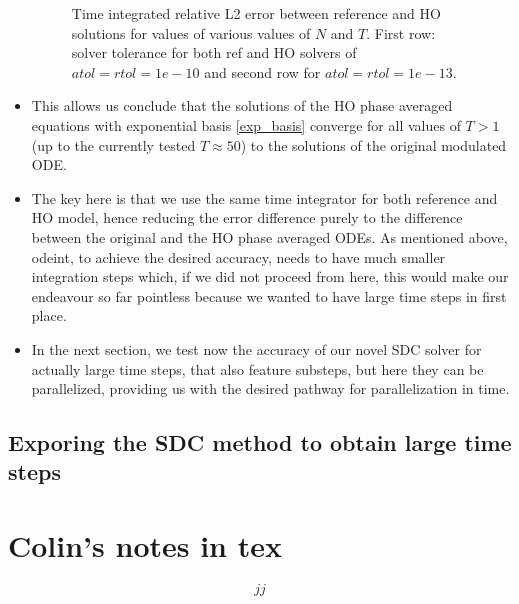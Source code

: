 \documentclass[a4,12pt]{article}
\begin{document}
\begin{itemize}
\begin{figure}[h]
\begin{tabular}{ccc}
\end{tabular}
\caption{Time integrated relative L2 error between reference and HO solutions for values of various values of $N$ and $T$. First row: solver tolerance for both ref and HO solvers of $atol = rtol = 1e-10$ and second row for
$atol = rtol = 1e-13$.
}
\label{fig_error_maps_odeint}
\end{figure}



\item This allows us conclude that the solutions of the HO phase averaged equations with exponential basis \eqref{exp_basis} converge for all values of $T >1 $ (up to the currently tested $T \approx 50$) to the solutions of the original modulated ODE.


\item The key here is that we use the same time integrator for both reference and HO model, hence reducing the error difference purely to the difference between the original and the HO phase averaged ODEs. As mentioned above, odeint, to achieve the desired accuracy, needs to have much smaller integration steps which, if we did not proceed from here, this would make our endeavour so far pointless because we wanted to have large time steps in first place.

\item In the next section, we test now the accuracy of our novel SDC solver for actually large time steps, that also feature substeps, but here they can be parallelized, providing us with the desired pathway for parallelization in time.


\end{itemize}







\subsection{Exporing the SDC method to obtain large time steps}







\newpage


\section{Colin's notes in tex}

\begin{equation}
jj 
\end{equation}
\end{document}
